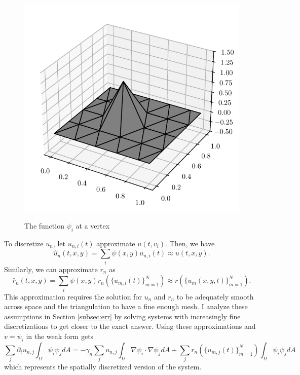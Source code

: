 \begin{figure}[t!]
    \centering
    \caption{The function $\psi_i$ at a vertex}
    \includegraphics{figures/psi.pdf}
    \label{fig:psi}
\end{figure}

To discretize $u_n$, let $u_{n, i} (t)$ approximate $u(t, v_i)$. Then, we have
\[
    \hat{u}_n (t, x, y) = \sum_i \psi(x, y) u_{n, i} (t) \approx u(t, x, y).
\]
Similarly, we can approximate $r_n$ as
\[
    \hat{r}_n (t, x, y) = \sum_i \psi(x, y) r_n \left(\{u_{m, i} (t)\}_{m = 1}^N\right) \approx r(\{u_{m} (x, y, t)\}_{m = 1}^N).
\]
This approximation requires the solution for $u_n$ and $r_n$ to be adequately smooth across space and the triangulation to have a fine enough mesh. I analyze these assumptions in Section \ref{subsec:err} by solving systems with increasingly fine discretizations to get closer to the exact answer. Using these approximations and $v = \psi_i$ in the weak form gets
\[
    \sum_j \partial_t u_{n, j} \int_\Omega \psi_i \psi_j dA = -\gamma_n \sum_j u_{n, j} \int_\Omega \nabla \psi_i \cdot \nabla \psi_j dA + \sum_j r_n \left(\{u_{m, j} (t)\}_{m = 1}^N\right) \int_\Omega \psi_i \psi_j dA
\]
which represents the spatially discretized version of the system.

